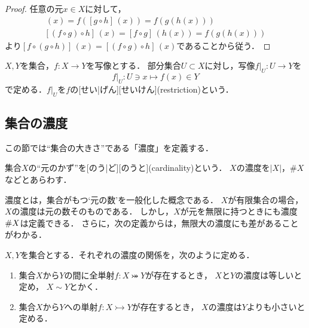 \documentclass[../sotsu.tex]{subfiles}
\begin{document}
\begin{proof}
    任意の元$x \in X$に対して，
    \begin{gather*}
        [f \circ (g \circ h)] \, (x)
            = f([g \circ h] \, (x))
            = f(g(h(x)))
        \\
        [(f \circ g) \circ h] \, (x)
            = [f \circ g] \, (h(x))
            = f(g(h(x)))
    \end{gather*}
    より$[f \circ (g \circ h)] \, (x) = [(f \circ g) \circ h] \, (x)$であることから従う．
\end{proof}


\begin{definition}[写像の制限]
    \label{dfn:restriction}
    $X, Y$を集合，$f \colon X \to Y$を写像とする．
    部分集合$U \subset X$に対し，写像$f \vert_{U} \colon U \to Y$を
    \begin{equation*}
        f \vert_U  \colon  U \ni x \longmapsto f(x) \in Y
    \end{equation*}
    で定める．$f \vert_U$を$f$の[せい|げん][せいけん](restriction)という．
\end{definition}


\subsection{集合の濃度}

この節では``集合の大きさ''である「濃度」を定義する．

\begin{definition}
    集合$X$の``元のかず''を[のう|ど][のうと](cardinality)という．
    $X$の濃度を$\lvert X \rvert$，$\# X$などとあらわす．
\end{definition}

濃度とは，集合がもつ`元の数'を一般化した概念である．
$X$が有限集合の場合，$X$の濃度は元の数そのものである．
しかし，$X$が元を無限に持つときにも濃度$\# X$は定義できる．
さらに，次の定義からは，無限大の濃度にも差があることがわかる．

\begin{definition}[濃度の大小]
    $X, Y$を集合とする．それぞれの濃度の関係を，次のように定める．
    \begin{enumerate}
        \item 集合$X$から$Y$の間に全単射$f \colon X \twoheadrightarrowtail Y$が存在するとき，
            $X$と$Y$の濃度は等しいと定め，
            $X \sim Y$とかく．
        \item 集合$X$から$Y$への単射$f \colon X \rightarrowtail Y$が存在するとき，
            $X$の濃度は$Y$よりも小さいと定める．
    \end{enumerate}
\end{definition}
\end{document}
